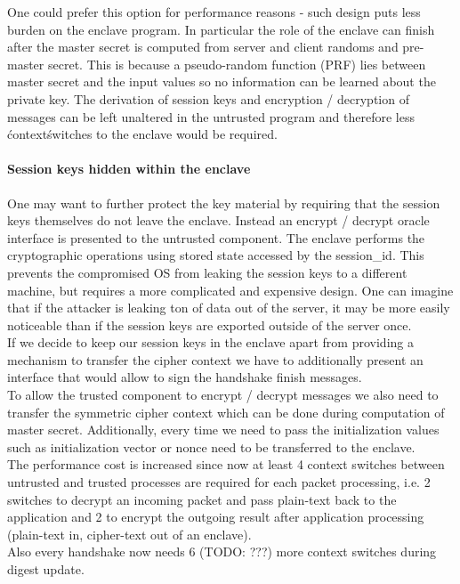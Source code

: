 \documentclass[../main.tex]{subfiles}
\begin{document}
\noindent
One could prefer this option for performance reasons - such design
puts less burden on the enclave program. In particular the role of the
enclave can finish after the master secret is computed from server and
client randoms and pre-master secret. This is because a pseudo-random
function (PRF) lies between master secret and the input values so no
information can be learned about the private key. The derivation of
session keys and encryption / decryption of messages can be left
unaltered in the untrusted program and therefore less \'context\'
switches to the enclave would be required.

\paragraph{Session keys hidden within the enclave}

One may want to further protect the key material by requiring that the
session keys themselves do not leave the enclave. Instead an encrypt /
decrypt oracle interface is presented to the untrusted component. The
enclave performs the cryptographic operations using stored state
accessed by the session\_id. This prevents the compromised OS from
leaking the session keys to a different machine, but requires a more
complicated and expensive design. One can imagine that if the attacker
is leaking ton of data out of the server, it may be more easily
noticeable than if the session keys are exported outside of the server
once.\\

\noindent
If we decide to keep our session keys in the enclave apart from
providing a mechanism to transfer the cipher context we have to
additionally present an interface that would allow to sign the
handshake finish messages.\\

\noindent
To allow the trusted component to encrypt / decrypt messages we also
need to transfer the symmetric cipher context which can be done during
computation of master secret. Additionally, every time we need to pass
the initialization values such as initialization vector or nonce need
to be transferred to the enclave.\\

\noindent
The performance cost is increased since now at least 4 context
switches between untrusted and trusted processes are required for each
packet processing, i.e. 2 switches to decrypt an incoming packet and
pass plain-text back to the application and 2 to encrypt the outgoing
result after application processing (plain-text in, cipher-text out of
an enclave).\\

\noindent
Also every handshake now needs 6 (TODO: ???) more context switches
during digest update.


\end{document}
